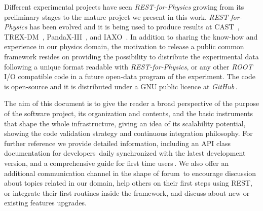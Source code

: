 Different experimental projects have seen \emph{REST-for-Physics} growing from its preliminary stages to the mature project we present in this work. \emph{REST-for-Physics} has been evolved and it is being used to produce results at CAST~\cite{Anastassopoulos:2017ftl}, TREX-DM~\cite{trexdm_bckmodel}, PandaX-III~\cite{pandaxiii_cdr,Lin:2018mpd,Galan:2019ake}, and IAXO~\cite{Armengaud:2019uso}. In addition to sharing the know-how and experience in our physics domain, the motivation to release a public common framework resides on providing the possibility to distribute the experimental data following a unique format readable with \emph{REST-for-Physics}, or any other \emph{ROOT} I/O compatible code in a future open-data program of the experiment. The code is open-source and it is distributed under a GNU public licence at \emph{GitHub}\,\cite{REST_Git}.

The aim of this document is to give the reader a broad perspective of the purpose of the software project, its organization and contents, and the basic instruments that shape the whole infrastructure, giving an idea of its scalability potential, showing the code validation strategy and continuous integration philosophy. For further reference we provide detailed information, including an API class documentation for developers\,\cite{REST_API} daily synchronized with the latest development version, and a comprehensive guide for first time users\,\cite{REST_user_guide}. We also offer an additional communication channel in the shape of forum\,\cite{REST_forum} to encourage discussion about topics related in our domain, help others on their first steps using REST, or integrate their first routines inside the framework, and discuss about new or existing features upgrades.






